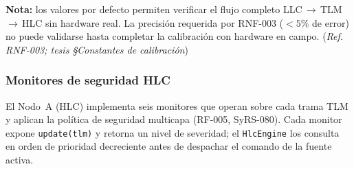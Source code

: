 \noindent\textbf{Nota:} los valores por defecto permiten verificar el flujo
completo LLC\,$\rightarrow$\,TLM\,$\rightarrow$\,HLC sin hardware real.
La precisión requerida por RNF-003 ($<5\%$ de error) no puede validarse
hasta completar la calibración con hardware en campo.
(\emph{Ref. RNF-003; tesis §Constantes de calibración})

\subsubsection{Monitores de seguridad HLC}
\label{sssec:icd_llc_monitors}

El Nodo~A (HLC) implementa seis monitores que operan sobre cada trama TLM
y aplican la política de seguridad multicapa (RF-005, SyRS-080).
Cada monitor expone \texttt{update(tlm)} y retorna un nivel de severidad;
el \texttt{HlcEngine} los consulta en orden de prioridad decreciente
antes de despachar el comando de la fuente activa.


